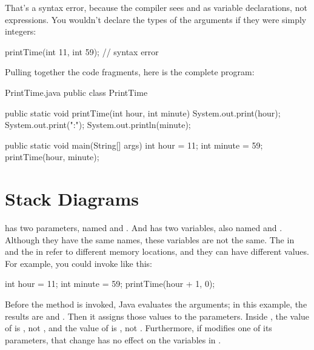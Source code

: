 That's a syntax error, because the compiler sees  and  as variable declarations, not expressions.
You wouldn't declare the types of the arguments if they were simply integers:

\begin{code}
printTime(int 11, int 59);  // syntax error
\end{code}

Pulling together the code fragments, here is the complete program:


\begin{trinket}[340]{PrintTime.java}
public class PrintTime {

    public static void printTime(int hour, int minute) {
        System.out.print(hour);
        System.out.print(":");
        System.out.println(minute);
    }

    public static void main(String[] args) {
        int hour = 11;
        int minute = 59;
        printTime(hour, minute);
    }
}
\end{trinket}


\section{Stack Diagrams}
\label{stack}

 has two parameters, named  and .
And  has two variables, also named  and .
Although they have the same names, these variables are not the same.
The  in  and the  in  refer to different memory locations, and they can have different values.
For example, you could invoke  like this:

\begin{code}
int hour = 11;
int minute = 59;
printTime(hour + 1, 0);
\end{code}

Before the method is invoked, Java evaluates the arguments; in this example, the results are  and .
Then it assigns those values to the parameters.
Inside , the value of  is , not , and the value of  is , not .
Furthermore, if  modifies one of its parameters, that change has no effect on the variables in .


